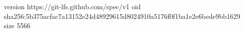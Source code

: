 version https://git-lfs.github.com/spec/v1
oid sha256:5b375acfac7a13152e24d48929615d8024910a5176f0f1ba1e2e6bede9bb1629
size 5566
